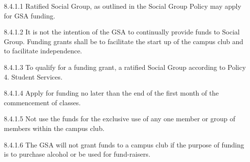  8.4.1.1 Ratified Social Group, as outlined in the Social Group Policy 
 may apply for GSA funding. 
 
 8.4.1.2 It is not the intention of the GSA to continually provide funds to 
 Social Group. Funding grants shall be to facilitate the start up of the 
 campus club and to facilitate independence. 
 
 8.4.1.3 To qualify for a funding grant, a ratified Social Group 
 according to Policy 4. Student Services. 
 
 8.4.1.4 Apply for funding no later than the end of the first month of the 
 commencement of classes. 
 
 8.4.1.5 Not use the funds for the exclusive use of any one member or 
 group of members within the campus club. 
 
 8.4.1.6 The GSA will not grant funds to a campus club if the purpose 
 of funding is to purchase alcohol or be used for fund-raisers. 